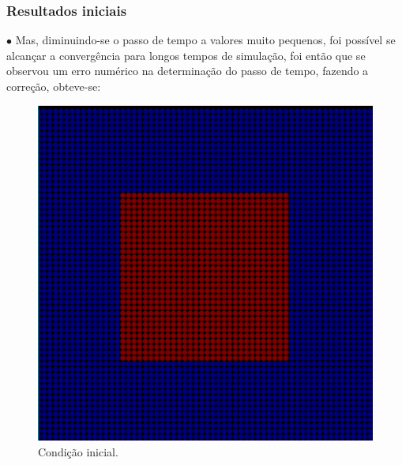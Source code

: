 \documentclass[xcolor=dvipsnames,10pt,aspectratio=169]{beamer}
\begin{document}
	\begin{frame}
		\frametitle{Resultados iniciais}
		$\bullet$ Mas, diminuindo-se o passo de tempo a valores muito pequenos, foi possível se alcançar a convergência para longos tempos de simulação, foi então que se observou um erro numérico na determinação do passo de tempo, fazendo a correção, obteve-se:\\
		\begin{minipage}[h!]{0.30\textwidth}
			\begin{figure}[h!]
				\centering
				\includegraphics[trim = {1cm 1cm 1cm 1cm}, clip , angle=0, scale=0.3]{images/sucesso_!}
				\caption{Condição inicial.}
			\end{figure}
		\end{minipage}
		\begin{minipage}[h!]{0.30\textwidth}
			\begin{figure}[h!]
				\centering

\end{figure}
\end{minipage}
\end{frame}
\end{document}
